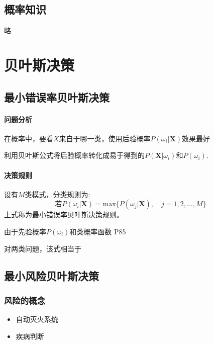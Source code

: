 \documentclass[11pt]{book}
\begin{document}
\subsection{概率知识}

略

\section{贝叶斯决策}


\subsection{最小错误率贝叶斯决策}

\paragraph{问题分析}%
\label{par:wen_ti_fen_xi_}

在概率中，要看$X$来自于哪一类，使用后验概率$P(\omega_i | \boldsymbol{X})$效果最好

利用贝叶斯公式将后验概率转化成易于得到的$P(\boldsymbol{X}|\omega_i)$和$P(\omega_i)$.

\paragraph{决策规则}%
\label{par:jue_ce_gui_ze_}

设有$M$类模式，分类规则为: 
\begin{equation}
	\mbox{若}P(\omega_i | \boldsymbol{X}) = \text{max}\{P(\omega_j | \boldsymbol{X}), \quad j = 1, 2, \ldots, M\}
\end{equation}
上式称为最小错误率贝叶斯决策规则。

由于先验概率$P(\omega_i)$和类概率函数 P85

对两类问题，该式相当于

\subsection{最小风险贝叶斯决策}

\subsubsection{风险的概念}%
\label{ssub:feng_xian_de_gai_nian_}

\begin{itemize}
	\item 自动灭火系统
	\item 疾病判断
\end{itemize}
\end{document}
